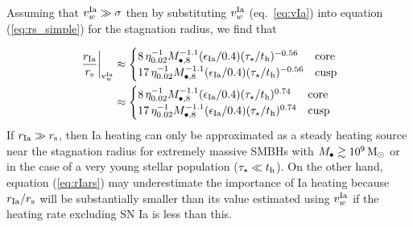 \documentclass[usenatbib,fleqn]{mn2e}
\begin{document}
Assuming that $v_{w}^{\rm Ia} \gg \sigma$ then by substituting
$v_{w}^{\rm Ia}$ (eq.~\ref{eq:vIa}) into equation (\ref{eq:rs_simple})
for the stagnation radius, we find that

\begin{align}
  \left.\frac{r_{\rm Ia}}{r_{\rm s}}\right|_{\rm v_{w}^{\rm Ia}}&\approx
  \begin{cases}
    8\, \eta_{0.02}^{-1} M_{\bullet,8}^{-1.1}(\epsilon_{\rm
     Ia}/0.4) (\tau_{\star}/t_{\rm h})^{-0.56}  & {\rm core}\\
    17\, \eta_{0.02}^{-1} M_{\bullet,8}^{-1.1}(\epsilon_{\rm
     Ia}/0.4) (\tau_{\star}/t_{\rm h})^{-0.56} &{\rm cusp}\\
   \end{cases} \nonumber\\
 &\approx 
 \begin{cases}
    8\, \eta_{0.02}^{-1} M_{\bullet,8}^{-1.1}(\epsilon_{\rm
     Ia}/0.4) (\tau_{\star}/t_{\rm h})^{0.74}  & {\rm core}\\
    17\, \eta_{0.02}^{-1} M_{\bullet,8}^{-1.1}(\epsilon_{\rm
     Ia}/0.4) (\tau_{\star}/t_{\rm h})^{0.74} &{\rm cusp}\\
   \end{cases}
\label{eq:rIars}
\end{align}
If $r_{\rm Ia} \gg r_{\rm s}$, then Ia heating can only be
approximated as a steady heating source near the stagnation radius for
extremely massive SMBHs with $M_{\bullet} \gtrsim 10^9 \,{\rm M_\odot}$ or in
the case of a very young stellar population ($\tau_{\star} \ll t_{\rm
h}$).  On the other hand, equation (\ref{eq:rIars}) may underestimate
the importance of Ia heating because $r_{\rm Ia}/r_{\rm s}$ will be
substantially smaller than its value estimated using $v_{w}^{\rm Ia}$
if the heating rate excluding SN Ia is less than this.
\end{document}
